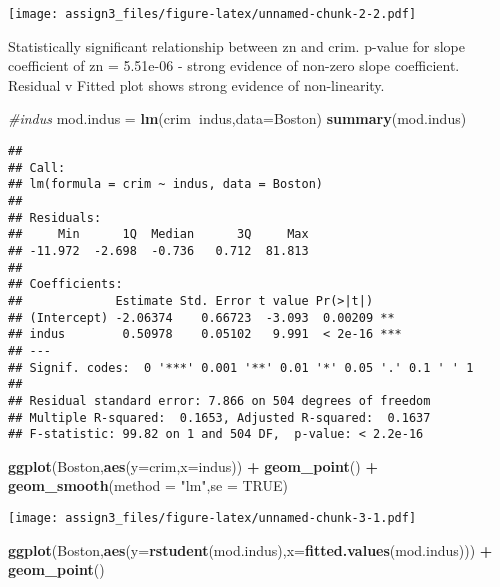 \documentclass[]{article}
\newenvironment{Shaded}{\begin{snugshade}}{\end{snugshade}}
\newcommand{\CommentTok}[1]{\textcolor[rgb]{0.56,0.35,0.01}{\textit{#1}}}
\newcommand{\DataTypeTok}[1]{\textcolor[rgb]{0.13,0.29,0.53}{#1}}
\newcommand{\KeywordTok}[1]{\textcolor[rgb]{0.13,0.29,0.53}{\textbf{#1}}}
\newcommand{\NormalTok}[1]{#1}
\newcommand{\OperatorTok}[1]{\textcolor[rgb]{0.81,0.36,0.00}{\textbf{#1}}}
\newcommand{\OtherTok}[1]{\textcolor[rgb]{0.56,0.35,0.01}{#1}}
\newcommand{\StringTok}[1]{\textcolor[rgb]{0.31,0.60,0.02}{#1}}
\begin{document}
\texttt{[image: assign3\_files/figure-latex/unnamed-chunk-2-2.pdf]}

Statistically significant relationship between zn and crim. p-value for
slope coefficient of zn = 5.51e-06 - strong evidence of non-zero slope
coefficient. Residual v Fitted plot shows strong evidence of
non-linearity.

\begin{Shaded}
\begin{Highlighting}[]
\CommentTok{#indus}
\NormalTok{mod.indus =}\StringTok{ }\KeywordTok{lm}\NormalTok{(crim}\OperatorTok{~}\NormalTok{indus,}\DataTypeTok{data=}\NormalTok{Boston)}
\KeywordTok{summary}\NormalTok{(mod.indus)}
\end{Highlighting}
\end{Shaded}

\begin{verbatim}
## 
## Call:
## lm(formula = crim ~ indus, data = Boston)
## 
## Residuals:
##     Min      1Q  Median      3Q     Max 
## -11.972  -2.698  -0.736   0.712  81.813 
## 
## Coefficients:
##             Estimate Std. Error t value Pr(>|t|)    
## (Intercept) -2.06374    0.66723  -3.093  0.00209 ** 
## indus        0.50978    0.05102   9.991  < 2e-16 ***
## ---
## Signif. codes:  0 '***' 0.001 '**' 0.01 '*' 0.05 '.' 0.1 ' ' 1
## 
## Residual standard error: 7.866 on 504 degrees of freedom
## Multiple R-squared:  0.1653, Adjusted R-squared:  0.1637 
## F-statistic: 99.82 on 1 and 504 DF,  p-value: < 2.2e-16
\end{verbatim}

\begin{Shaded}
\begin{Highlighting}[]
\KeywordTok{ggplot}\NormalTok{(Boston,}\KeywordTok{aes}\NormalTok{(}\DataTypeTok{y=}\NormalTok{crim,}\DataTypeTok{x=}\NormalTok{indus)) }\OperatorTok{+}\StringTok{ }\KeywordTok{geom_point}\NormalTok{() }\OperatorTok{+}\StringTok{ }\KeywordTok{geom_smooth}\NormalTok{(}\DataTypeTok{method =} \StringTok{"lm"}\NormalTok{,}\DataTypeTok{se =} \OtherTok{TRUE}\NormalTok{)}
\end{Highlighting}
\end{Shaded}

\texttt{[image: assign3\_files/figure-latex/unnamed-chunk-3-1.pdf]}

\begin{Shaded}
\begin{Highlighting}[]
\KeywordTok{ggplot}\NormalTok{(Boston,}\KeywordTok{aes}\NormalTok{(}\DataTypeTok{y=}\KeywordTok{rstudent}\NormalTok{(mod.indus),}\DataTypeTok{x=}\KeywordTok{fitted.values}\NormalTok{(mod.indus))) }\OperatorTok{+}\StringTok{ }\KeywordTok{geom_point}\NormalTok{() }
\end{Highlighting}
\end{Shaded}
\end{document}
